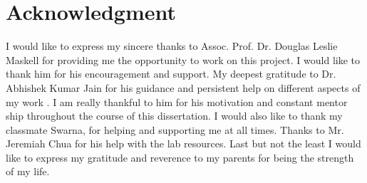 
\chapter*{Acknowledgment} 
\label{ch0_Acknowledgement}
I would like to express my sincere thanks to Assoc. Prof. Dr. Douglas Leslie Maskell for providing me the opportunity to work on this project. I would like to thank him for his encouragement and support.
My deepest gratitude to Dr. Abhishek Kumar Jain for his guidance and persistent help on different aspects of my work . I am really thankful to him for his motivation and constant mentor ship throughout the course of this dissertation.
I would also like to thank my classmate Swarna, for helping and supporting me at all times.
Thanks to Mr. Jeremiah Chua for his help with the lab resources.
Last but not the least I would like to express my gratitude and reverence to my parents for being the strength of my life.

% 
% 
% 
%  
% 






